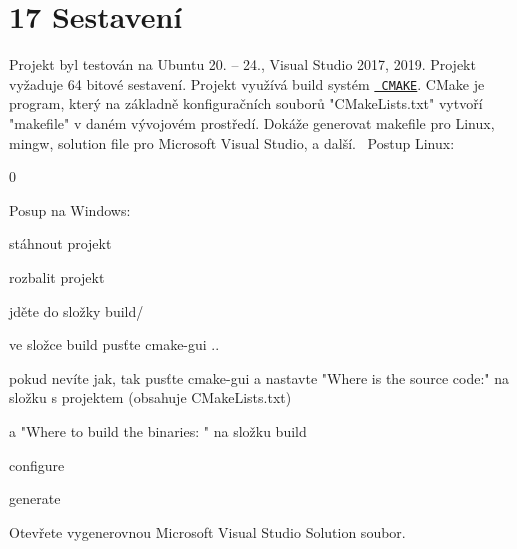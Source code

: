 \chapter{17 Sestavení}
\hypertarget{p17_sestaveni}{}\label{p17_sestaveni}
Projekt byl testován na Ubuntu 20. -- 24., Visual Studio 2017, 2019. Projekt vyžaduje 64 bitové sestavení. Projekt využívá build systém \href{https://cmake.org/}{\texttt{ CMAKE}}. CMake je program, který na základně konfiguračních souborů "{}\+CMake\+Lists.\+txt"{} vytvoří "{}makefile"{} v daném vývojovém prostředí. Dokáže generovat makefile pro Linux, mingw, solution file pro Microsoft Visual Studio, a další.~\newline
 Postup Linux\+: 
\begin{DoxyCode}{0}

\end{DoxyCode}
 Posup na Windows\+:
\begin{DoxyEnumerate}
\item stáhnout projekt
\item rozbalit projekt
\item jděte do složky build/
\item ve složce build pusťte cmake-\/gui ..
\item pokud nevíte jak, tak pusťte cmake-\/gui a nastavte "{}\+Where is the source code\+:"{} na složku s projektem (obsahuje CMake\+Lists.\+txt)
\item a "{}\+Where to build the binaries\+: "{} na složku build
\item configure
\item generate
\item Otevřete vygenerovnou Microsoft Visual Studio Solution soubor. 
\end{DoxyEnumerate}